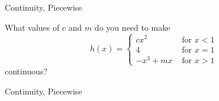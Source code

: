 
\begin{tagblock}{Continuity, Piecewise}
\begin{question}
	
What values of $c$ and $m$ do you need to make
\[ h(x) = \begin{cases} 
cx^2 & \text{ for }   x< 1 \\
4 & \text{ for }  x=1 \\
-x^3+mx & \text{ for } x>1 \end{cases}\]
continuous?  
	
\begin{tags}
	   Continuity, Piecewise
\end{tags}
	
\begin{diary}
	   
\end{diary}


	

	\end{question}
	
	\end{tagblock}




